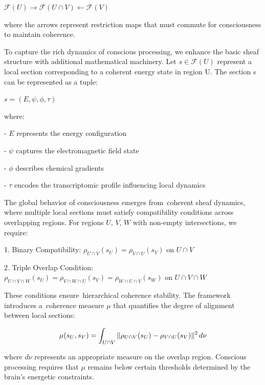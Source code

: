 $\mathcal{F}(U) \rightarrow \mathcal{F}(U \cap V) \leftarrow \mathcal{F}(V)$

where the arrows represent restriction maps that must commute for consciousness to maintain coherence.

To capture the rich dynamics of conscious processing, we enhance the basic sheaf structure with additional mathematical machinery. Let $s \in \mathcal{F}(U)$ represent a local section corresponding to a coherent energy state in region U. The section s can be represented as a tuple:

$s = (E, \psi, \phi, \tau)$

where:

- $E$ represents the energy configuration

- $\psi$ captures the electromagnetic field state

- $\phi$ describes chemical gradients

- $\tau$ encodes the transcriptomic profile influencing local dynamics

The global behavior of consciousness emerges from~coherent sheaf dynamics, where multiple local sections must satisfy compatibility conditions across overlapping regions. For regions $U$, $V$, $W$ with non-empty intersections, we require:

1. Binary Compatibility:
$\rho_{U \cap V}(s_U) = \rho_{V \cap U}(s_V) \text{ on } U \cap V$

2. Triple Overlap Condition:
$\rho_{U \cap V \cap W}(s_U) = \allowbreak \rho_{V \cap W \cap U}(s_V) = \allowbreak \rho_{W \cap U \cap V}(s_W) \text{ on } U \cap V \cap W$

These conditions ensure~hierarchical coherence stability. The framework introduces a~coherence measure $\mu$ that quantifies the degree of alignment between local sections:

\begin{equation}
  \mu(s_U, s_V) = \int_{U \cap V} \|\rho_{U \cap V}(s_U) - \rho_{V \cap U}(s_V)\|^2 \,d\nu
  \myequation{Coherence measure for alignment between local sections}
  \label{eq:coherence_measure}
\end{equation}

where $d\nu$ represents an appropriate measure on the overlap region. Conscious processing requires that $\mu$ remains below certain thresholds determined by the brain's energetic constraints.

